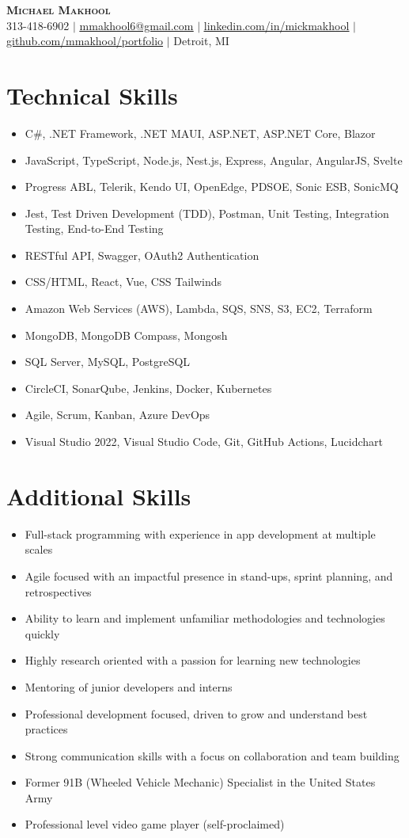 \documentclass[letterpaper,11pt]{article}
\newcommand{\resumeItem}[1]{
  \item\small{
    {#1 \vspace{-2pt}}
  }
}
\newcommand{\resumeItemListStart}{\begin{itemize}}
\newcommand{\resumeItemListEnd}{\end{itemize}\vspace{-5pt}}
\begin{document}
\begin{center}
    \textbf{\Huge \scshape Michael Makhool} \\ \vspace{1pt}
    \small 313-418-6902 $|$ \href{mailto:mmakhool6@gmail.com}{\underline{mmakhool6@gmail.com}} $|$ 
    \href{https://linkedin.com/in/mickmakhool}{\underline{linkedin.com/in/mickmakhool}} $|$
    \href{https://github.com/mmakhool/portfolio}{\underline{github.com/mmakhool/portfolio}} $|$
    \small Detroit, MI
\end{center}

\section{Technical Skills}
  \resumeItemListStart
    \resumeItem{C\#, .NET Framework, .NET MAUI, ASP.NET, ASP.NET Core, Blazor}
    \resumeItem{JavaScript, TypeScript, Node.js, Nest.js, Express, Angular, AngularJS, Svelte}
    \resumeItem{Progress ABL, Telerik, Kendo UI, OpenEdge, PDSOE, Sonic ESB, SonicMQ}
    \resumeItem{Jest, Test Driven Development (TDD), Postman, Unit Testing, Integration Testing, End-to-End Testing}
    \resumeItem{RESTful API, Swagger, OAuth2 Authentication}
    \resumeItem{CSS/HTML, React, Vue, CSS Tailwinds}
    \resumeItem{Amazon Web Services (AWS), Lambda, SQS, SNS, S3, EC2, Terraform}
    \resumeItem{MongoDB, MongoDB Compass, Mongosh}
    \resumeItem{SQL Server, MySQL, PostgreSQL}
    \resumeItem{CircleCI, SonarQube, Jenkins, Docker, Kubernetes}
    \resumeItem{Agile, Scrum, Kanban, Azure DevOps}
    \resumeItem{Visual Studio 2022, Visual Studio Code, Git, GitHub Actions, Lucidchart}
  \resumeItemListEnd

\section{Additional Skills}
  \resumeItemListStart
    \resumeItem{Full-stack programming with experience in app development at multiple scales}
    \resumeItem{Agile focused with an impactful presence in stand-ups, sprint planning, and retrospectives}
    \resumeItem{Ability to learn and implement unfamiliar methodologies and technologies quickly}
    \resumeItem{Highly research oriented with a passion for learning new technologies}
    \resumeItem{Mentoring of junior developers and interns}
    \resumeItem{Professional development focused, driven to grow and understand best practices}
    \resumeItem{Strong communication skills with a focus on collaboration and team building}
    \resumeItem{Former 91B (Wheeled Vehicle Mechanic) Specialist in the United States Army}
    \resumeItem{Professional level video game player (self-proclaimed)}
  \resumeItemListEnd
\end{document}
